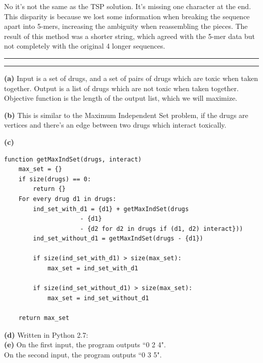\documentclass[11pt,letterpaper]{article}
\newcommand{\question}[1] {\vspace{.25in} \hrule\vspace{0.5em}
\noindent{\bf #1} \vspace{0.5em}
\hrule \vspace{.10in}}
\renewcommand{\part}[1] {\vspace{.10in} {\bf (#1)}}
\begin{document}
No it's not the same as the TSP solution. It's missing one character at the end.
This disparity is because we lost some information when breaking the sequence apart into 5-mers, increasing the ambiguity when reassembling the pieces.
The result of this method was a shorter string, which agreed with the 5-mer data but not completely with the original 4 longer sequences.

\question{4}
\part{a}
Input is a set of drugs, and a set of pairs of drugs which are toxic when taken together.
Output is a list of drugs which are not toxic when taken together.
Objective function is the length of the output list, which we will maximize.

\part{b}
This is similar to the Maximum Independent Set problem, if the drugs are vertices and there's an edge between two drugs which interact toxically.

\part{c}

\begin{verbatim}
function getMaxIndSet(drugs, interact)
    max_set = {}
    if size(drugs) == 0:
        return {}
    For every drug d1 in drugs:
        ind_set_with_d1 = {d1} + getMaxIndSet(drugs
                     - {d1}
                     - {d2 for d2 in drugs if (d1, d2) interact}))
        ind_set_without_d1 = getMaxIndSet(drugs - {d1})

        if size(ind_set_with_d1) > size(max_set):
            max_set = ind_set_with_d1

        if size(ind_set_without_d1) > size(max_set):
            max_set = ind_set_without_d1

    return max_set
\end{verbatim}

\part{d}
Written in Python 2.7:\\


\part{e}
On the first input, the program outputs ``0 2 4".\\
On the second input, the program outputs ``0 3 5".\\
\end{document}

